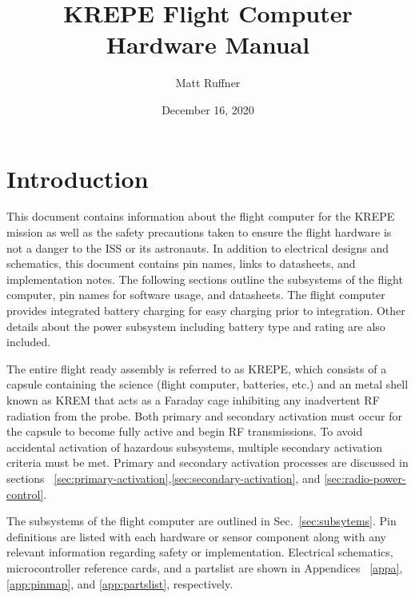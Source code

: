 \documentclass{article}
\title{KREPE Flight Computer Hardware Manual}
\author{Matt Ruffner}
\date{December 16, 2020}
\begin{document}
\maketitle
\tableofcontents
\listoffigures
\listoftables
\newpage


\section{Introduction}

This document contains information about the flight computer for the KREPE mission as well as the safety precautions taken to ensure the flight hardware is not a danger to the ISS or its astronauts. In addition to electrical designs and schematics, this document contains pin names, links to datasheets, and implementation notes. The following sections outline the subsystems of the flight computer, pin names for software usage, and datasheets. The flight computer provides integrated battery charging for easy charging prior to integration. Other details about the power subsystem including battery type and rating are also included. 

The entire flight ready assembly is referred to as KREPE, which consists of a capsule containing the science (flight computer, batteries, etc.) and an metal shell known as KREM that acts as a Faraday cage inhibiting any inadvertent RF radiation from the probe. Both primary and secondary activation must occur for the capsule to become fully active and begin RF transmissions. To avoid accidental activation of hazardous subsystems, multiple secondary activation criteria must be met. Primary and secondary activation processes are discussed in sections ~\ref{sec:primary-activation},\ref{sec:secondary-activation}, and \ref{sec:radio-power-control}.

The subsystems of the flight computer are outlined in Sec.~\ref{sec:subsytems}. Pin definitions are listed with each hardware or sensor component along with any relevant information regarding safety or implementation. Electrical schematics, microcontroller reference cards, and a partslist are shown in  Appendices ~\ref{appa}, \ref{app:pinmap}, and \ref{app:partslist}, respectively.
\end{document}

